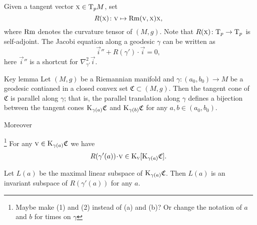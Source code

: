 \documentclass[a4paper,10pt]{article}
\begin{document}
Given a tangent vector $\text{\sc{x}}\in\mathrm{T}_pM$, set
\[R(\text{\sc{x}})\colon\text{\sc{v}}\mapsto \operatorname{Rm}(\text{\sc{v}},\text{\sc{x}})\text{\sc{x}},\]
where $\operatorname{Rm}$ denotes the curvature tensor of $(M,g)$.
Note that $R(\text{\sc{x}})\colon\mathrm{T}_p\to \mathrm{T}_p$ is  self-adjoint.
The Jacobi equation along a geodesic $\gamma$ can be written as 
\[\vec{i}''+R(\gamma')\cdot \vec{i}=0,\]
here  $\vec{i}''$ is a shortcut for $\nabla^2_{\gamma'}\vec{i}$.
 
\begin{thm}{Key lemma}\label{lem:key}
Let $(M,g)$ be a Riemannian manifold and {\color{red}  $\gamma :(a_0,b_0)\to M $ be a geodesic %
contianed} in a closed convex set $\mathfrak{C}\subset (M,g)$.
Then the tangent cone of $\mathfrak{C}$ is parallel along $\gamma$; that is, the parallel translation along $\gamma$ defines a bijection between the tangent cones $\mathrm{K}_{\gamma(a)}\mathfrak{C}$ and $\mathrm{K}_{\gamma(b)}\mathfrak{C}$ for any $a,b \in (a_0,b_0)$.

Moreover
\begin{subthm}{}    \footnote{Maybe make (1) and (2) instead of (a) and (b)? Or change the notation of $a$ and $b$ for times on $\gamma$}
For any $\text{\sc{v}}\in \mathrm{K}_{\gamma(a)}\mathfrak{C}$ we have
\[R(\gamma'(a))\cdot \vec{v}\in \K_\vec{v}[\K_{\gamma(a)}\mathfrak{C}].\]
\end{subthm}

\begin{subthm}{} Let $L(a)$ be the maximal linear subspace of $\mathrm{K}_{\gamma(a)}\mathfrak{C}$.
Then $L(a)$ is an invariant subspace of $R(\gamma'(a))$ for any $a$.
\end{subthm}

\end{thm}


\end{document}
